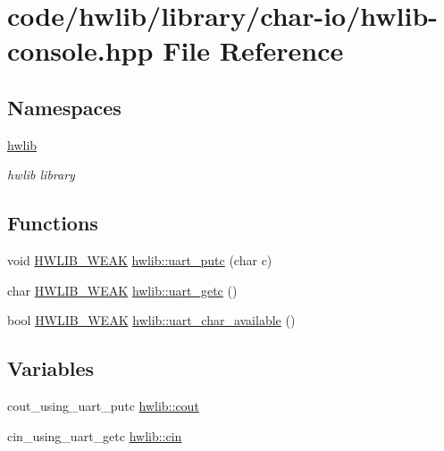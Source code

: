 \hypertarget{hwlib-console_8hpp}{}\section{code/hwlib/library/char-\/io/hwlib-\/console.hpp File Reference}
\label{hwlib-console_8hpp}
\subsection*{Namespaces}
\begin{DoxyCompactItemize}
\item 
 \hyperlink{namespacehwlib}{hwlib}
\begin{DoxyCompactList}\small\item\em hwlib library \end{DoxyCompactList}\end{DoxyCompactItemize}
\subsection*{Functions}
\begin{DoxyCompactItemize}
\item 
void \hyperlink{hwlib-defines_8hpp_a04be4340016df60d6636c1d1c6d94fc9}{H\+W\+L\+I\+B\+\_\+\+W\+E\+AK} \hyperlink{namespacehwlib_ae568ebef4b8d8a77cecae8cea595896f}{hwlib\+::uart\+\_\+putc} (char c)
\item 
char \hyperlink{hwlib-defines_8hpp_a04be4340016df60d6636c1d1c6d94fc9}{H\+W\+L\+I\+B\+\_\+\+W\+E\+AK} \hyperlink{namespacehwlib_aa5ee60a7ff11cc49aba41f8be7f08a67}{hwlib\+::uart\+\_\+getc} ()
\item 
bool \hyperlink{hwlib-defines_8hpp_a04be4340016df60d6636c1d1c6d94fc9}{H\+W\+L\+I\+B\+\_\+\+W\+E\+AK} \hyperlink{namespacehwlib_aaf31868f62815d2e405ad90469ae50a5}{hwlib\+::uart\+\_\+char\+\_\+available} ()
\end{DoxyCompactItemize}
\subsection*{Variables}
\begin{DoxyCompactItemize}
\item 
cout\+\_\+using\+\_\+uart\+\_\+putc \hyperlink{namespacehwlib_a7de728368e57486f51717f911401a604}{hwlib\+::cout}
\item 
cin\+\_\+using\+\_\+uart\+\_\+getc \hyperlink{namespacehwlib_ad736b5e00021a29fc5543ec7b36dfe14}{hwlib\+::cin}
\end{DoxyCompactItemize}
